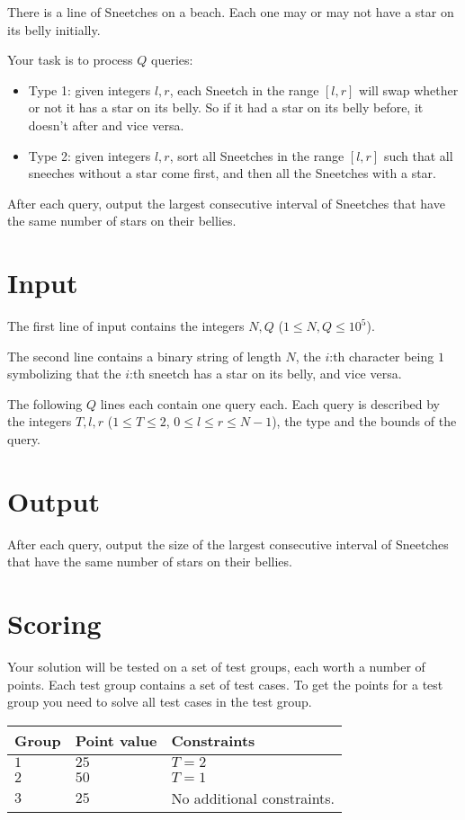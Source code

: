 There is a line of Sneetches on a beach. Each one may or may not have a star on its belly initially.

Your task is to process $Q$ queries:

\begin{itemize}
    \item Type 1: given integers $l, r$, each Sneetch in the range $[l,r]$ will swap whether or not it has a star on its belly.
    So if it had a star on its belly before, it doesn't after and vice versa.
    \item Type 2: given integers $l, r$, sort all Sneetches in the range $[l, r]$ such that all sneeches without a star
    come first, and then all the Sneetches with a star.
\end{itemize}

After each query, output the largest consecutive interval of Sneetches that have the same number of stars on their bellies.

\section*{Input}
The first line of input contains the integers $N,Q$ ($1 \leq N,Q \leq 10^5$).

The second line contains a binary string of length $N$, the $i$:th character being $1$ symbolizing that the $i$:th sneetch has
a star on its belly, and vice versa. 

The following $Q$ lines each contain one query each. Each query is described by the integers
$T, l, r$ ($1 \leq T \leq 2$, $0 \leq l \leq r \leq N - 1$), the type and the bounds of the query.

\section*{Output}
After each query, output the size of the largest consecutive interval of Sneetches that have the same number of stars on their bellies.


\section*{Scoring}
Your solution will be tested on a set of test groups, each worth a number of points.
Each test group contains a set of test cases.
To get the points for a test group you need to solve all test cases in the test group.

\noindent
\begin{tabular}{| l | l | p{12cm} |}
  \hline
  \textbf{Group} & \textbf{Point value} & \textbf{Constraints} \\ \hline
  $1$    & $25$         & $T = 2$  \\ \hline
  $2$    & $50$         & $T = 1$ \\ \hline
  $3$    & $25$         & No additional constraints. \\ \hline
\end{tabular}

